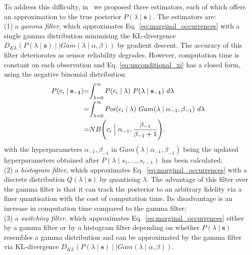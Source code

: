 To address this difficulty, in~\cite{jovan18a} we proposed three estimators, each of which offers an approximation to the true posterior $P(\lambda \mid \mathbf{s})$. The estimators are: \\
(1) a \textit{gamma filter}, which approximates Eq.~\ref{eq:marginal_occurrences} with a single gamma distribution minimising the KL-divergence $D_{KL}(P(\lambda \mid \mathbf{s}) \mid \mid Gam(\lambda \mid \alpha, \beta))$ by gradient descent. The accuracy of this filter deteriorates as sensor reliability degrades. However, computation time is constant on each observation and Eq. \ref{eq:unconditional_xi} has a closed form, using the negative binomial distribution
\begin{equation}
\label{eq:unconditional_xi_gamma_filter}
\begin{tabular}{r@{=}l}
$P(c_i \mid \mathbf{s_{-1}})$ & $\displaystyle\int_{\lambda=0}^{\infty} P(c_i \mid \lambda) ~ P(\lambda \mid \mathbf{s_{-1}}) ~d\lambda$ \\ [2ex]
& $\displaystyle\int_{\lambda=0}^{\infty} Poi(c_i \mid \lambda) ~ Gam(\lambda \mid \alpha_{-1}, \beta_{-1}) ~d\lambda$ \\ [2ex]
& $NB\Bigg(c_i \Bigm| \alpha_{-1}, \displaystyle\frac{\beta_{-1}}{\beta_{-1} + 1}\Bigg)$.
\end{tabular}
\end{equation}
\noindent with the hyperparameters $\alpha_{-1}, \beta_{-1}$ in $Gam(\lambda \mid \alpha_{-1}, \beta_{-1})$ being the updated hyperparameters obtained after $P(\lambda \mid s_1, \ldots, s_{i-1})$ has been calculated;\\
(2) a \textit{histogram filter}, which approximates Eq.~\ref{eq:marginal_occurrences} with a discrete distribution $Q(\lambda \mid \mathbf{s})$ by quantising $\lambda$. The advantage of this filter over the gamma filter is that it can track the posterior to an arbitrary fidelity via a finer quantisation with the cost of computation time. Its disadvantage is an increase in computation time compared to the gamma filter; \\
(3) a \textit{switching filter}, which approximates Eq.~\ref{eq:marginal_occurrences} either by a gamma filter or by a histogram filter depending on whether $P(\lambda \mid \mathbf{s})$  resembles a gamma distribution and can be approximated by the gamma filter via KL-divergence $D_{KL}(P(\lambda \mid \mathbf{s}) \mid \mid Gam(\lambda \mid \alpha, \beta))$.

